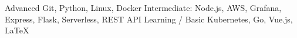 

\begin{cvskills}

  \cvskill
    {Advanced} %
    {Git, Python, Linux, Docker} %
  \cvskill
    {Intermediate:} %
    {Node.js, AWS, Grafana, Express, Flask, Serverless, REST API} %
  \cvskill
    {Learning / Basic} %
    {Kubernetes, Go, Vue.js, LaTeX} %


\end{cvskills}
